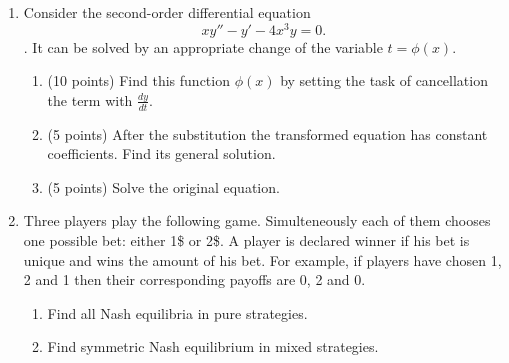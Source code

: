 \documentclass[12pt,a4paper]{article}
\begin{document}
\begin{enumerate}[resume]


\item Consider the second-order differential equation
\[
xy'' - y' - 4{x^3}y = 0.
\].
It can be solved by an appropriate change of the variable $t = \phi (x)$.
\begin{enumerate}
  \item (10 points) Find this function $\phi (x)$ by setting the task of cancellation the term with $\frac{{dy}}{{dt}}$.
  \item (5 points) After the substitution the transformed equation has constant coefficients. Find its general solution.
  \item (5 points) Solve the original equation.
\end{enumerate}

\item Three players play the following game. Simulteneously each of them chooses one possible bet: either 1\$ or 2\$. A player is declared winner if his bet is unique and wins the amount of his bet. For example, if players have chosen 1, 2 and 1 then their corresponding payoffs are 0, 2 and 0.

\begin{enumerate}
  \item Find all Nash equilibria in pure strategies.
  \item Find symmetric Nash equilibrium in mixed strategies.
\end{enumerate}

\end{enumerate}
\end{document}
